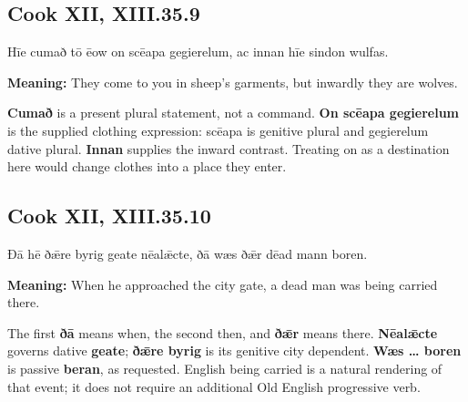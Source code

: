 \par\begin{minipage}{\linewidth}\raggedright
\subsection*{Cook XII, XIII.35.9}

Hīe cumað tō ēow on scēapa gegierelum, ac innan hīe sindon wulfas.

\textbf{Meaning:} They come to you in sheep’s garments, but inwardly they are wolves.

\textbf{Cumað} is a present plural statement, not a command. \textbf{On scēapa gegierelum} is the supplied clothing expression: scēapa is genitive plural and gegierelum dative plural. \textbf{Innan} supplies the inward contrast. Treating on as a destination here would change clothes into a place they enter.

\end{minipage}\par\addvspace{4pt}

\par\begin{minipage}{\linewidth}\raggedright
\subsection*{Cook XII, XIII.35.10}

Ðā hē ðǣre byrig geate nēalǣcte, ðā wæs ðǣr dēad mann boren.

\textbf{Meaning:} When he approached the city gate, a dead man was being carried there.

The first \textbf{ðā} means when, the second then, and \textbf{ðǣr} means there. \textbf{Nēalǣcte} governs dative \textbf{geate}; \textbf{ðǣre byrig} is its genitive city dependent. \textbf{Wæs … boren} is passive \textbf{beran}, as requested. English being carried is a natural rendering of that event; it does not require an additional Old English progressive verb.

\end{minipage}\par\addvspace{4pt}

